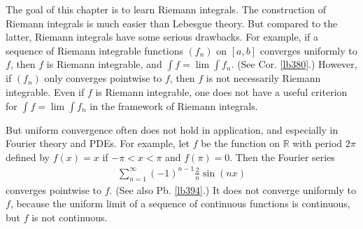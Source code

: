 \documentclass[12pt,b5paper,notitlepage]{article}
\theoremstyle{definition}
\theoremstyle{plain}
\newcommand{\Rbb}{\mathbb R}
\newcommand{\eps}{\varepsilon}
\numberwithin{equation}{section}
\begin{document}





The goal of this chapter is to learn Riemann integrals. The construction of Riemann integrals is much easier than Lebesgue theory. But compared to the latter, Riemann integrals have some serious drawbacks. For example, if a sequence of Riemann integrable functions $(f_n)$ on $[a,b]$ converges uniformly to $f$, then $f$ is Riemann integrable, and $\int f=\lim \int f_n$. (See Cor. \ref{lb380}.) However, if $(f_n)$ only converges pointwise to $f$, then $f$ is not necessarily Riemann integrable. Even if $f$ is Riemann integrable, one does not have a useful criterion for $\int f=\lim \int f_n$ in the framework of Riemann integrals. 

But uniform convergence often does not hold in application, and especially in Fourier theory and PDEs. For example, let $f$ be the function on $\Rbb$ with period $2\pi$ defined by $f(x)=x$ if $-\pi<x<\pi$ and $f(\pi)=0$. Then the Fourier series
\begin{align}
\sum_{n=1}^\infty (-1)^{n-1}\frac 2n\sin(nx) \label{eq194}
\end{align}
converges pointwise to $f$. (See also Pb. \ref{lb394}.) It does not converge uniformly to $f$, because the uniform limit of a sequence of continuous functions is continuous, but $f$ is not continuous.
\end{document}
